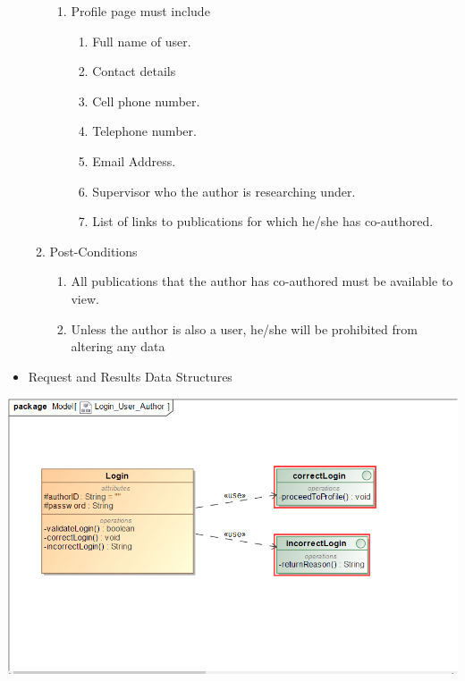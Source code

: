 \documentclass[hidelinks,a4paper,12pt]{article}
\begin{document}
\begin{enumerate}
\begin{enumerate}
\begin{enumerate}
				\item  Profile page must include
				
				\begin{enumerate}
					\item  Full name of user.
					
					\item  Contact details
					
					\item  Cell phone number.
					
					\item  Telephone number.
					
					\item  Email Address.
					
					\item  Supervisor who the author is researching under.
					
					\item  List of links to publications for which he/she has co-authored.
				\end{enumerate}
			\end{enumerate}
			
			\item  Post-Conditions
			
			\begin{enumerate}
				\item  All publications that the author has co-authored must be available to view.
				
				\item  Unless the author is also a user, he/she will be prohibited from altering any data  
			\end{enumerate}
		\end{enumerate}
	\end{enumerate}
	
	
	
	\begin{itemize}
		\item  Request and Results Data Structures
	\end{itemize}
	
	\includegraphics[width=1\textwidth]{./Graphs/Login.png}\\[0.4cm]  
	
\end{document}
